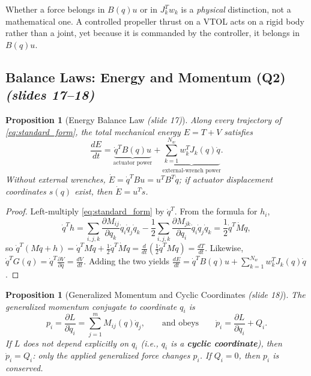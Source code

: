 \documentclass[11pt, a4paper]{article}
\theoremstyle{definition}
\theoremstyle{plain}
\newtheorem{proposition}[definition]{Proposition}
\begin{document}
\begin{intuition}
Whether a force belongs in $B(q)u$ or in $J_k^T w_k$ is a \emph{physical} distinction, not a mathematical one. A controlled propeller thrust on a VTOL acts on a rigid body rather than a joint, yet because it is commanded by the controller, it belongs in $B(q)u$.
\end{intuition}

\subsection{Balance Laws: Energy and Momentum (Q2) \emph{(slides 17--18)}}

\begin{proposition}[Energy Balance Law \emph{(slide 17)}]
Along every trajectory of \eqref{eq:standard_form}, the total mechanical energy $E = T + V$ satisfies
\[
  \frac{dE}{dt} = \underbrace{\dot{q}^T B(q) u}_{\text{actuator power}} + \underbrace{\sum_{k=1}^{N_w} w_k^T J_k(q)\dot{q}}_{\text{external-wrench power}}.
\]
Without external wrenches, $\dot{E} = \dot{q}^T B u = u^T B^T \dot{q}$; if actuator displacement coordinates $s(q)$ exist, then $\dot{E} = u^T \dot{s}$.
\end{proposition}

\begin{proof}
Left-multiply \eqref{eq:standard_form} by $\dot{q}^T$. From the formula for $h_i$,
\[
  \dot{q}^T h = \sum_{i,j,k} \frac{\partial M_{ij}}{\partial q_k}\dot{q}_i \dot{q}_j \dot{q}_k - \frac{1}{2}\sum_{i,j,k}\frac{\partial M_{jk}}{\partial q_i}\dot{q}_i \dot{q}_j \dot{q}_k = \frac{1}{2}\dot{q}^T \dot{M} \dot{q},
\]
so $\dot{q}^T(M\ddot{q} + h) = \dot{q}^T M \ddot{q} + \frac{1}{2}\dot{q}^T \dot{M}\dot{q} = \frac{d}{dt}\left(\frac{1}{2}\dot{q}^T M \dot{q}\right) = \frac{dT}{dt}$. Likewise, $\dot{q}^T G(q) = \dot{q}^T \frac{\partial V}{\partial q} = \frac{dV}{dt}$. Adding the two yields $\frac{dE}{dt} = \dot{q}^T B(q)u + \sum_{k=1}^{N_w} w_k^T J_k(q)\dot{q}$.
\end{proof}

\begin{proposition}[Generalized Momentum and Cyclic Coordinates \emph{(slide 18)}]
The generalized momentum conjugate to coordinate $q_i$ is
\[
  p_i = \frac{\partial L}{\partial \dot{q}_i} = \sum_{j=1}^{m} M_{ij}(q)\dot{q}_j,
  \qquad \text{and obeys} \qquad
  \dot{p}_i = \frac{\partial L}{\partial q_i} + Q_i.
\]
If $L$ does not depend explicitly on $q_i$ (i.e., $q_i$ is a \textbf{cyclic coordinate}), then $\dot{p}_i = Q_i$: only the applied generalized force changes $p_i$. If $Q_i = 0$, then $p_i$ is conserved.
\end{proposition}
\end{document}
